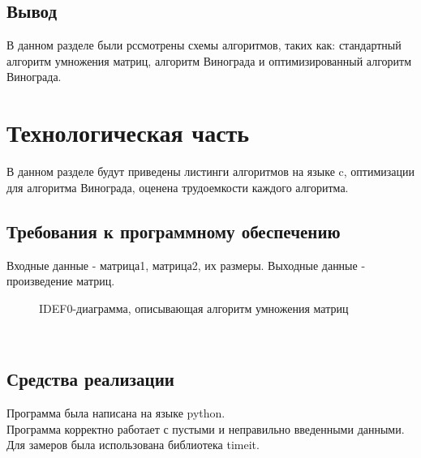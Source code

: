 \documentclass[a4paper, 14pt]{article}
\begin{document}
\subsection{Вывод}
		В данном разделе были рссмотрены схемы алгоритмов, таких как: стандартный алгоритм умножения матриц, алгоритм Винограда и оптимизированный алгоритм Винограда.\\
        
    	\newpage
        \section{Технологическая часть}
        
        В данном разделе будут приведены листинги алгоритмов на языке c, оптимизации для алгоритма Винограда, оценена трудоемкости каждого алгоритма.\\
        \subsection{Требования к программному обеспечению}
        Входные данные - матрица1, матрица2, их размеры.
        Выходные данные - произведение матриц.
          \begin{figure}[h]
        	\caption{IDEF0-диаграмма, описывающая алгоритм умножения матриц}
        	\label{fig:schema_vinograd_optimized}
        \end{figure} \\
		\subsection{Средства реализации}
		Программа была написана на языке python.\\
		Программа корректно работает с пустыми и неправильно введенными данными.\\
		Для замеров была использована библиотека timeit.\\
		
\end{document}
